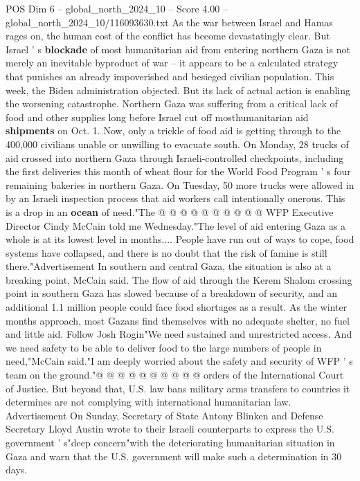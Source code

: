 \begin{textsample}{POS Dim 6 – global\_north\_2024\_10 – Score 4.00 – global\_north\_2024\_10/116093630.txt}  \label{ex:f6_pos_377}
As the war between Israel and Hamas rages on, the human cost of the conflict has become devastatingly clear.
But Israel ' s \textbf{blockade} of most humanitarian aid from entering northern Gaza is not merely an inevitable byproduct of war -- it appears to be a calculated strategy that punishes an already impoverished and besieged civilian population.
This week, the Biden administration objected.
But its lack of actual action is enabling the worsening catastrophe.
Northern Gaza was suffering from a critical lack of food and other supplies long before Israel cut off mosthumanitarian aid \textbf{shipments} on Oct. 1.
Now, only a trickle of food aid is getting through to the 400,000 civilians unable or unwilling to evacuate south.
On Monday, 28 trucks of aid crossed into northern Gaza through Israeli-controlled checkpoints, including the first deliveries this month of wheat flour for the World Food Program ' s four remaining bakeries in northern Gaza.
On Tuesday, 50 more trucks were allowed in by an Israeli inspection process that aid workers call intentionally onerous.
This is a drop in an \textbf{ocean} of need."The @ @ @ @ @ @ @ @ @ @ WFP Executive Director Cindy McCain told me Wednesday."The level of aid entering Gaza as a whole is at its lowest level in months....
People have run out of ways to cope, food systems have collapsed, and there is no doubt that the risk of famine is still there."Advertisement In southern and central Gaza, the situation is also at a breaking point, McCain said.
The flow of aid through the Kerem Shalom crossing point in southern Gaza has slowed because of a breakdown of security, and an additional 1.1 million people could face food shortages as a result.
As the winter months approach, most Gazans find themselves with no adequate shelter, no fuel and little aid.
Follow Josh Rogin"We need sustained and unrestricted access.
And we need safety to be able to deliver food to the large numbers of people in need,"McCain said."I am deeply worried about the safety and security of WFP ' s team on the ground."@ @ @ @ @ @ @ @ @ @ orders of the International Court of Justice.
But beyond that, U.S. law bans military arms transfers to countries it determines are not complying with international humanitarian law.
Advertisement On Sunday, Secretary of State Antony Blinken and Defense Secretary Lloyd Austin wrote to their Israeli counterparts to express the U.S. government ' s"deep concern"with the deteriorating humanitarian situation in Gaza and warn that the U.S. government will make such a determination in 30 days.

\end{textsample}
